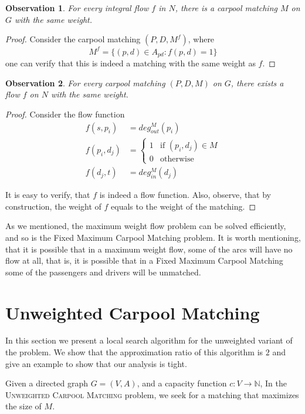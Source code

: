 \documentclass[draft]{article}
\def\N{\mathbb{N}}
\newtheorem{observation}{Observation}
\newcommand{\din}[1][M]{deg^M_{in}}
\newcommand{\dout}[1][M]{deg^M_{out}}
\def\UWCARPOOL{Unweighted Carpool Matching}
\def\FIXEDCARPOOL{Fixed Maximum Carpool Matching}
\begin{document}
\begin{observation}
For every integral flow $f$ in $N$, there is a carpool matching $M$ on $G$ with
the same weight.
\end{observation}

\begin{proof}
Consider the carpool matching $(P, D, M^f)$, where 
$$ M^f = \{(p, d) \in A_{pd} : f(p, d) = 1\} $$
one can verify that this is indeed a matching with the same weight as $f$.
\end{proof}

\begin{observation}
For every carpool matching $(P, D, M)$ on $G$, there exists a flow $f$ on $N$
with the same weight.
\end{observation}

\begin{proof}
Consider the flow function
\begin{align*}
f(s, p_i)		& = \dout(p_i)		 				\\
f(p_i, d_j)		& = 
				\begin{cases}
				1 & \text{if } (p_i, d_j) \in M		\\
				0 & \text{otherwise}
				\end{cases}						\\
f(d_j, t) 	& = \din(d_j) 
\end{align*}

It is easy to verify, that $f$ is indeed a flow function.
Also, observe, that by construction,
the weight of $f$ equals to the weight of the matching.
\end{proof}

As we mentioned, 
the maximum weight flow problem can be solved efficiently, 
and so is the \FIXEDCARPOOL{} problem.
It is worth mentioning, that it is possible that in a maximum weight flow, 
some of the arcs will have no flow at all, 
that is, it is possible that in a \FIXEDCARPOOL{}
some of the passengers and drivers will be unmatched.  

\section{\UWCARPOOL{}}
\label{sec:uwcm}
In this section we present a local search algorithm for the unweighted
variant of the problem.
We show that the approximation ratio of this algorithm is $2$ and give an example
to show that our analysis is tight.

Given a directed graph $G = (V, A)$, 
and a capacity function ${c : V \rightarrow \N}$, 
In the \textsc{\UWCARPOOL{}} problem, 
we seek for a matching that maximizes the size of $M$.
\end{document}
